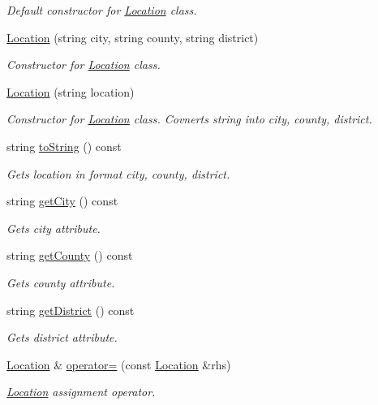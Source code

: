 \begin{DoxyCompactItemize}
\begin{DoxyCompactList}\small\item\em Default constructor for \hyperlink{class_location}{Location} class. \end{DoxyCompactList}\item 
\hyperlink{class_location_adde1be165887d4738c25164191107f8a}{Location} (string city, string county, string district)
\begin{DoxyCompactList}\small\item\em Constructor for \hyperlink{class_location}{Location} class. \end{DoxyCompactList}\item 
\hyperlink{class_location_aa41373bb46efc066f79ab697c56b0da3}{Location} (string location)
\begin{DoxyCompactList}\small\item\em Constructor for \hyperlink{class_location}{Location} class. Covnerts string into city, county, district. \end{DoxyCompactList}\item 
string \hyperlink{class_location_a4d91190cad2ea40b0e8d53f5211561a6}{to\+String} () const 
\begin{DoxyCompactList}\small\item\em Gets location in format city, county, district. \end{DoxyCompactList}\item 
string \hyperlink{class_location_ac682ee57f401c50a88d362305d159640}{get\+City} () const 
\begin{DoxyCompactList}\small\item\em Gets city attribute. \end{DoxyCompactList}\item 
string \hyperlink{class_location_aa200afd4afd7898f16c5e54c533da4ef}{get\+County} () const 
\begin{DoxyCompactList}\small\item\em Gets county attribute. \end{DoxyCompactList}\item 
string \hyperlink{class_location_a989ce807f112210952bad662d38185dd}{get\+District} () const 
\begin{DoxyCompactList}\small\item\em Gets district attribute. \end{DoxyCompactList}\item 
\hyperlink{class_location}{Location} \& \hyperlink{class_location_a41a15b0cfd590d365e31f613d32eebd1}{operator=} (const \hyperlink{class_location}{Location} \&rhs)
\begin{DoxyCompactList}\small\item\em \hyperlink{class_location}{Location} assignment operator. \end{DoxyCompactList}\end{DoxyCompactItemize}
